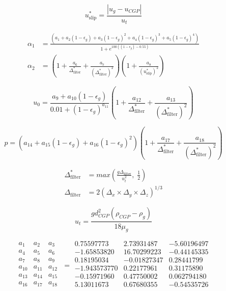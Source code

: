 \begin{equation}
    u_{\text{slip}}^* = \frac{|u_g - u_{CGP}|}{u_t}
\end{equation}

\begin{align}
    \alpha_1 &= \frac{\left(a_1 + a_2(1 - \epsilon_g) + a_3(1 - \epsilon_g)^2 + a_4(1 - \epsilon_g)^3 + a_5(1 - \epsilon_g)^4 \right)}{1 + e^{100 \left((1 - \epsilon_g) - 0.55 \right)}} \\
    \alpha_2 &= \left(1 + \frac{a_6}{\Delta_{\text{filter}}^*} + \frac{a_7}{(\Delta_{\text{filter}}^*)^2} \right) \left(1 + \frac{a_8}{(u_{\text{slip}}^*)^2} \right)
\end{align}

\begin{equation}
    u_0 = \frac{a_9 + a_{10} (1 - \epsilon_g)}{0.01 + (1 - \epsilon_g)^{a_{11}}} \left(1 + \frac{a_{12}}{\Delta_{\text{filter}}^*} + \frac{a_{13}}{(\Delta_{\text{filter}}^*)^2} \right)
\end{equation}

\begin{equation}
    p = \left(a_{14} + a_{15}(1 - \epsilon_g) + a_{16}(1 - \epsilon_g)^2 \right) \left(1 + \frac{a_{17}}{\Delta_{\text{filter}}^*} + \frac{a_{18}}{(\Delta_{\text{filter}}^*)^2} \right)
\end{equation}

\begin{align}
    \Delta_{\text{filter}}^* &= max\left( \frac{g \Delta_{\text{filter}}}{u_t^2}, \; \frac{1}{2} \right) \\
    \Delta_{\text{filter}} &= 2 (\Delta_x \times \Delta_y \times \Delta_z)^{1/3}
\end{align}

\begin{equation}
    u_t = \frac{g d_{CGP}^2 (\rho_{CGP} - \rho_g)}{18 \mu_g}
\end{equation}

\begin{equation}
    \begin{matrix}
        a_1    & a_2    & a_3 \\
        a_4    & a_5    & a_6 \\
        a_7    & a_8    & a_9 \\
        a_{10} & a_{11} & a_{12} \\
        a_{13} & a_{14} & a_{15} \\
        a_{16} & a_{17} & a_{18} \\
    \end{matrix}
    \; =
    \begin{array}{rrr}
        0.75597773   & 2.73931487  & -5.60196497 \\
        -1.65853820  & 16.70299223 & -0.44145335 \\
        0.18195034   & -0.01827347 & 0.28441799  \\
        -1.943573770 & 0.22177961  & 0.31175890  \\
        -0.15971960  & 0.47750002  & 0.062794180 \\
        5.13011673   & 0.67680355  & -0.54535726 \\
    \end{array}
\end{equation}
